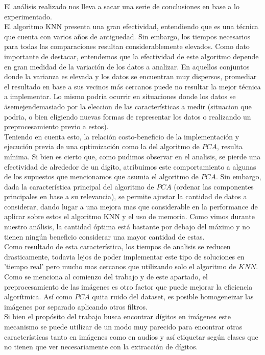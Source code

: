 El análisis realizado nos lleva a sacar una serie de conclusiones en base a lo experimentado.
\\
El algoritmo KNN presenta una gran efectividad, entendiendo que es una técnica que cuenta con varios años de antiguedad. Sin embargo, los tiempos necesarios para todas las comparaciones resultan considerablemente elevados.
Como dato importante de destacar, entendemos que la efectividad de este algoritmo depende en gran medidad de la variación de los datos a analizar. En aquellos conjuntos donde la varianza es elevada y los datos se encuentran muy dispersos, promediar el resultado en base a sus vecinos más cercanos puede no resultar la mejor técnica a implementar. Lo mismo podria ocurrir en situaciones donde los datos se \"asemejen\" demasiado por la eleccion de las características a medir (situacion que podria, o bien eligiendo nuevas formas de representar los datos o realizando un preprocesamiento previo a estos).
\\
Teniendo en cuenta esto, la relación costo-beneficio de la implementación y ejecución previa de una optimización como la del algoritmo de $PCA$, resulta mínima. Si bien es cierto que, como pudimos observar en el analisis, se pierde una efectividad de alrededor de un digito, atribuimos este comportamiento a algunas de los supuestos que mencionamos que asumia el algoritmo de $PCA$.
Sin embargo, dada la característica principal del algoritmo de $PCA$ (ordenar las componentes principales en base a su relevancia), se permite ajustar la cantidad de datos a considerar, dando lugar a una mejora mas que considerable en la performance de aplicar sobre estos el algoritmo KNN y el uso de memoria. Como vimos durante nuestro análisis, la cantidad óptima está bastante por debajo del máximo y no tienen ningún beneficio considerar una mayor cantidad de estas.
\\
Como resultado de esta característica, los tiempos de analisis se reducen drasticamente, todavia lejos de poder implementar este tipo de soluciones en 'tiempo real' pero mucho mas cercanos que utilizando solo el algoritmo de $KNN$.
\\
Como se menciona al comienzo del trabajo y de este apartado, el preprocesamiento de las imágenes es otro factor que puede mejorar la eficiencia algorítmica. Así como $PCA$ quita ruido del dataset, es posible homogeneizar las imágenes por separado aplicando otros filtros.
\\
Si bien el propósito del trabajo busca encontrar dígitos en imágenes este mecanismo se puede utilizar de un modo muy parecido para encontrar otras características tanto en imágenes como en audios y así etiquetar según clases que no tienen que ver necesariamente con la extracción de dígitos. 
